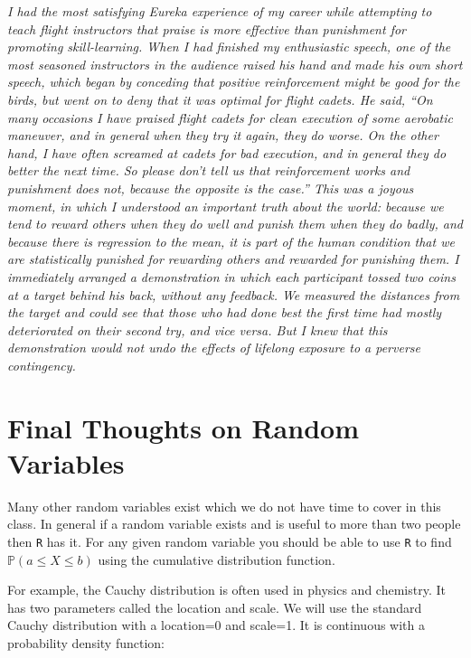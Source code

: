 \documentclass[
]{book}
\theoremstyle{definition}
\theoremstyle{definition}
\theoremstyle{definition}
\theoremstyle{definition}
\theoremstyle{remark}
\begin{document}
\emph{I had the most satisfying Eureka experience of my career while attempting to teach flight instructors that praise is more effective than punishment for promoting skill-learning. When I had finished my enthusiastic speech, one of the most seasoned instructors in the audience raised his hand and made his own short speech, which began by conceding that positive reinforcement might be good for the birds, but went on to deny that it was optimal for flight cadets. He said, ``On many occasions I have praised flight cadets for clean execution of some aerobatic maneuver, and in general when they try it again, they do worse. On the other hand, I have often screamed at cadets for bad execution, and in general they do better the next time. So please don't tell us that reinforcement works and punishment does not, because the opposite is the case.'' This was a joyous moment, in which I understood an important truth about the world: because we tend to reward others when they do well and punish them when they do badly, and because there is regression to the mean, it is part of the human condition that we are statistically punished for rewarding others and rewarded for punishing them. I immediately arranged a demonstration in which each participant tossed two coins at a target behind his back, without any feedback. We measured the distances from the target and could see that those who had done best the first time had mostly deteriorated on their second try, and vice versa. But I knew that this demonstration would not undo the effects of lifelong exposure to a perverse contingency. }

\hypertarget{final-thoughts-on-random-variables}{%
\section{Final Thoughts on Random Variables}\label{final-thoughts-on-random-variables}}

Many other random variables exist which we do not have time to cover in this class. In general if a random variable exists and is useful to more than two people then \texttt{R} has it. For any given random variable you should be able to use \texttt{R} to find \(\mathbb{P}(a\leq X \leq b)\) using the cumulative distribution function.

For example, the Cauchy distribution is often used in physics and chemistry. It has two parameters called the location and scale. We will use the standard Cauchy distribution with a location=0 and scale=1. It is continuous with a probability density function:
\end{document}
